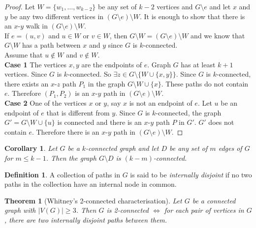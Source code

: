 \documentclass{article}
\newtheorem*{thm}{Theorem}
\newtheorem*{cor}{Corollary}
\theoremstyle{definition}
\newtheorem*{defn}{Definition}
\begin{document}
\begin{proof}
Let $W=\{w_1,\ldots,w_{k-2}\}$ be any set of $k-2$ vertices and $G\setminus e$ and let $x$ and $y$ be any two different vertices in $(G\setminus e)\setminus W$.
It is enough to show that there is an $x$-$y$ walk in $(G\setminus e)\setminus W$. \\
If $e=(u,v)$ and $u\in W$ or $v\in W$, then $G\setminus W = (G\setminus e) \setminus W$ and we know that $G\setminus W$ has a path between $x$ and $y$ since $G$ is $k$-connected. \\
Assume that $u\not\in W$ and $v\not\in W$. \\
\textbf{Case 1} The vertices $x,y$ are the endpoints of $e$.
Graph $G$ has at least $k+1$ vertices.
Since $G$ is $k$-connected. 
So $\exists z\in G\setminus\{W\cup\{x,y\}\}$.
Since $G$ is $k$-connected, there exists an $x$-$z$ path $P_1$ in the graph $G\setminus W\cup\{x\}$.
These paths do not contain $e$.
Therefore $(P_1,P_2)$ is an $x$-$y$ path in $(G\setminus e)\setminus W$. \\
\textbf{Case 2} One of the vertices $x$ or $y$, say $x$ is not an endpoint of $e$.
Let $u$ be an endpoint of $e$ that is different from $y$.
Since $G$ is $k$-connected, the graph $G' = G\setminus W\cup\{u\}$ is connected and there is an $x$-$y$ path $P$ in $G'$.
$G'$ does not contain $e$.
Therefore there is an $x$-$y$ path in $(G\setminus e)\setminus W$.
\end{proof}


\begin{cor}
Let $G$ be a $k$-connected graph and let $D$ be any set of $m$ edges of $G$ for $m\le k-1$.
Then the graph $G\setminus D$ is $(k-m)$-connected.
\end{cor}

\begin{defn}
A collection of paths in $G$ is said to be \emph{internally disjoint} if no two paths in the collection have an internal node in common.
\end{defn}

\begin{thm}[Whitney's 2-connected characterisation]
Let $G$ be a connected graph with $|V(G)| \ge 3$.
Then $G$ is 2-connected $\iff$ for each pair of vertices in $G$, there are two internally disjoint paths between them.
\end{thm}
\end{document}

